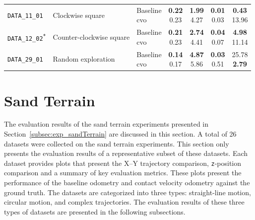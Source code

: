 \documentclass[report.tex]{subfiles}
\begin{document}
\begin{table}[!htbp]
\begin{tabularx}{\textwidth}{
            >{\raggedright\arraybackslash}m{1.55cm}
            >{\raggedright\arraybackslash}X
            l
            cccc
        }
            \texttt{DATA\_11\_01}
            & Clockwise square
            & \makecell[l]{Baseline\\\gls{cvo}}
            & \makecell{\textbf{0.22}\\0.23}
            & \makecell{\textbf{1.99}\\4.27}
            & \makecell{\textbf{0.01}\\0.03}
            & \makecell{\textbf{0.43}\\13.96} \\
            \addlinespace

            \texttt{DATA\_12\_02\textsuperscript{*}}
            & Counter-clockwise square
            & \makecell[l]{Baseline\\\gls{cvo}}
            & \makecell{\textbf{0.21}\\0.23}
            & \makecell{\textbf{2.74}\\4.41}
            & \makecell{\textbf{0.04}\\0.07}
            & \makecell{\textbf{4.98}\\11.14} \\
            \addlinespace

            \texttt{DATA\_29\_01}
            & Random exploration
            & \makecell[l]{Baseline\\\gls{cvo}}
            & \makecell{\textbf{0.14}\\0.17}
            & \makecell{\textbf{4.87}\\5.86}
            & \makecell{\textbf{0.03}\\0.51}
            & \makecell{25.78\\\textbf{2.79}} \\

            \bottomrule
                   
        \end{tabularx}
    \end{table}
    
    \section{Sand Terrain} \label{sec:sandTerrainResults}   
    
    The evaluation results of the sand terrain experiments presented in Section~\ref{subsec:exp_sandTerrain} are discussed in this section. A total of 26 datasets were collected on the sand terrain experiments. This section only presents the evaluation results of a representative subset of these datasets. Each dataset provides plots that present the X--Y trajectory comparison, \texttt{z}-position comparison and a summary of key evaluation metrics. These plots present the performance of the baseline odometry and contact velocity odometry against the ground truth. The datasets are categorized into three types: straight-line motion, circular motion, and complex trajectories. The evaluation results of these three types of datasets are presented in the following subsections.
\end{document}
